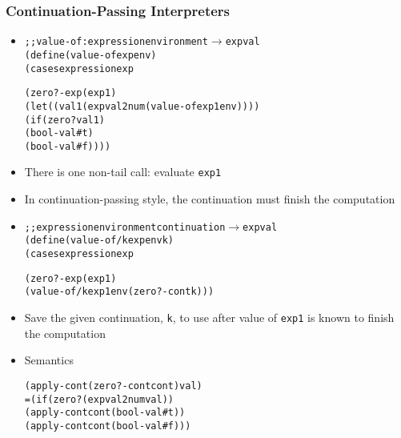 \documentclass{beamer}
\newcommand{\arrow}{\(\rightarrow\)}
\begin{document}
\begin{frame}[fragile]
\frametitle{Continuation-Passing Interpreters}
\begin{scriptsize}
\begin{itemize}
\item<1->
\begin{alltt}
;; value-of : expression environment \arrow{} expval
(define (value-of exp env)
  (cases expression exp

    (zero?-exp (exp1)
               (let ((val1 (expval2num (value-of exp1 env))))
                 (if (zero? val1)
                     (bool-val #t)
                     (bool-val #f))))
\end{alltt}

\item<1-> There is one non-tail call: evaluate \texttt{exp1}

\item<1-> In continuation-passing style, the continuation must finish the computation

\item<2->
\begin{alltt}
;; expression environment continuation \arrow{} expval
(define (value-of/k exp env k)
  (cases expression exp

    (zero?-exp (exp1)
               (value-of/k exp1 env (zero?-cont k)))
\end{alltt}

\item<2-> Save the given continuation, \texttt{k}, to use after value of \texttt{exp1} is known to finish the computation

\item<3-> Semantics
\begin{alltt}
  (apply-cont (zero?-cont cont) val)
= (if (zero? (expval2num val))
      (apply-cont cont (bool-val #t))
      (apply-cont cont (bool-val #f)))
\end{alltt}

\end{itemize}
\end{scriptsize}
\end{frame}
\end{document}
